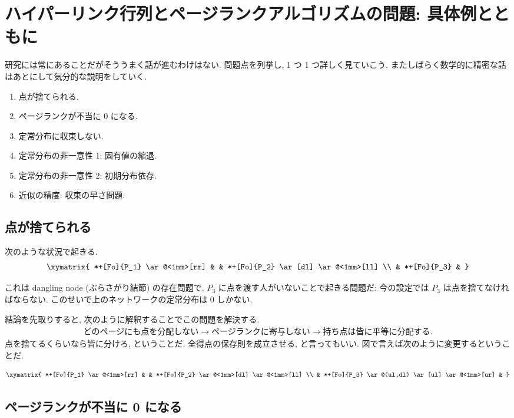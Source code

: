 \documentclass[openany, a4paper, oneside]{jsbook}
\begin{document}
\section{ハイパーリンク行列とページランクアルゴリズムの問題: 具体例とともに}

研究には常にあることだがそううまく話が進むわけはない.
問題点を列挙し, 1 つ 1 つ詳しく見ていこう.
またしばらく数学的に精密な話はあとにして気分的な説明をしていく.
\begin{enumerate}
\item 点が捨てられる.
\item ページランクが不当に 0 になる.
\item 定常分布に収束しない.
\item 定常分布の非一意性 1: 固有値の縮退.
\item 定常分布の非一意性 2: 初期分布依存.
\item 近似の精度: 収束の早さ問題.
\end{enumerate}
\subsection{点が捨てられる}

次のような状況で起きる.
\begin{gather}
 \xymatrix{
  *+[Fo]{P_1} \ar@<1mm>[rr] & & *+[Fo]{P_2} \ar[dl] \ar@<1mm>[ll] \\
  & *+[Fo]{P_3} &
 }
\end{gather}

これは dangling node (ぶらさがり結節) の存在問題で,
$P_3$ に点を渡す人がいないことで起きる問題だ: 今の設定では $P_3$ は点を捨てなければならない.
このせいで上のネットワークの定常分布は 0 しかない.

結論を先取りすると, 次のように解釈することでこの問題を解決する.
\begin{align}
 \text{どのページにも点を分配しない}
 \to \text{ページランクに寄与しない}
 \to \text{持ち点は皆に平等に分配する}.
\end{align}
点を捨てるくらいなら皆に分けろ, ということだ.
全得点の保存則を成立させる, と言ってもいい.
図で言えば次のように変更するということだ.

\begin{gather}
 \xymatrix{
   *+[Fo]{P_1} \ar@<1mm>[rr] & & *+[Fo]{P_2} \ar@<1mm>[dl] \ar@<1mm>[ll] \\
   & *+[Fo]{P_3} \ar@(ul,dl) \ar[ul] \ar@<1mm>[ur] &
 }
\end{gather}
\subsection{ページランクが不当に 0 になる}
\end{document}
